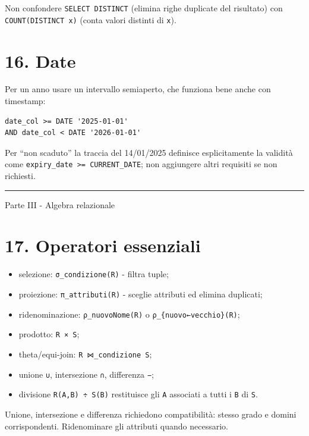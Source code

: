 \documentclass[
  10pt,
  a4paper,
]{article}
\providecommand{\tightlist}{%
  \setlength{\itemsep}{0pt}\setlength{\parskip}{0pt}}
\begin{document}
Non confondere \texttt{SELECT\ DISTINCT} (elimina righe duplicate del
risultato) con \texttt{COUNT(DISTINCT\ x)} (conta valori distinti di
\texttt{x}).

\section{16. Date}\label{16-date}

Per un anno usare un intervallo semiaperto, che funziona bene anche con
timestamp:

\begin{verbatim}
date_col >= DATE '2025-01-01'
AND date_col < DATE '2026-01-01'
\end{verbatim}

Per ``non scaduto'' la traccia del 14/01/2025 definisce esplicitamente
la validità come \texttt{expiry\_date\ \textgreater{}=\ CURRENT\_DATE};
non aggiungere altri requisiti se non richiesti.

\begin{center}\rule{0.5\linewidth}{0.5pt}\end{center}

Parte III - Algebra relazionale

\section{17. Operatori essenziali}\label{17-operatori-essenziali}

\begin{itemize}
\tightlist
\item
  selezione: \texttt{σ\_condizione(R)} - filtra tuple;
\item
  proiezione: \texttt{π\_attributi(R)} - sceglie attributi ed elimina
  duplicati;
\item
  ridenominazione: \texttt{ρ\_nuovoNome(R)} o
  \texttt{ρ\_\{nuovo←vecchio\}(R)};
\item
  prodotto: \texttt{R\ ×\ S};
\item
  theta/equi-join: \texttt{R\ ⋈\_condizione\ S};
\item
  unione \texttt{∪}, intersezione \texttt{∩}, differenza \texttt{−};
\item
  divisione \texttt{R(A,B)\ ÷\ S(B)} restituisce gli \texttt{A}
  associati a tutti i \texttt{B} di \texttt{S}.
\end{itemize}

Unione, intersezione e differenza richiedono compatibilità: stesso grado
e domini corrispondenti. Ridenominare gli attributi quando necessario.
\end{document}
